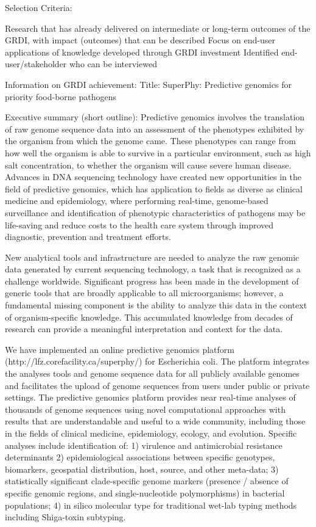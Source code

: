Selection Criteria:

Research that has already delivered on intermediate or long-term outcomes of the GRDI, with impact (outcomes) that can be described
Focus on end-user applications of knowledge developed through GRDI investment
Identified end-user/stakeholder who can be interviewed


Information on GRDI achievement:
Title: SuperPhy: Predictive genomics for priority food-borne pathogens

Executive summary (short outline):
Predictive genomics involves the translation of raw genome sequence data into an assessment of the phenotypes exhibited by the organism from which the genome came. These phenotypes can range from how well the organism is able to survive in a particular environment, such as high salt concentration, to whether the organism will cause severe human disease. Advances in DNA sequencing technology have created new opportunities in the field of predictive genomics, which has application to fields as diverse as clinical medicine and epidemiology, where performing real-time, genome-based surveillance and identification of phenotypic characteristics of pathogens may be life-saving and reduce costs to the health care system through improved diagnostic, prevention and treatment efforts.

New analytical tools and infrastructure are needed to analyze the raw genomic data generated by current sequencing technology, a task that is recognized as a challenge worldwide. Significant progress has been made in the development of generic tools that are broadly applicable to all microorganisms; however, a fundamental missing component is the ability to analyze this data in the context of organism-specific knowledge. This accumulated knowledge from decades of research can provide a meaningful interpretation and context for the data. 

We have implemented an online predictive genomics platform (http://lfz.corefacility.ca/superphy/) for Escherichia coli. The platform integrates the analyses tools and genome sequence data for all publicly available genomes and facilitates the upload of genome sequences from users under public or private settings. The predictive genomics platform provides near real-time analyses of thousands of genome sequences using novel computational approaches with results that are understandable and useful to a wide community, including those in the fields of clinical medicine, epidemiology, ecology, and evolution. Specific analyses include identification of: 1) virulence and antimicrobial resistance determinants 2) epidemiological associations between specific genotypes, biomarkers, geospatial distribution, host, source, and other meta-data; 3) statistically significant clade-specific genome markers (presence / absence of specific genomic regions, and single-nucleotide polymorphisms) in bacterial populations; 4) in silico molecular type for traditional wet-lab typing methods including Shiga-toxin subtyping.


